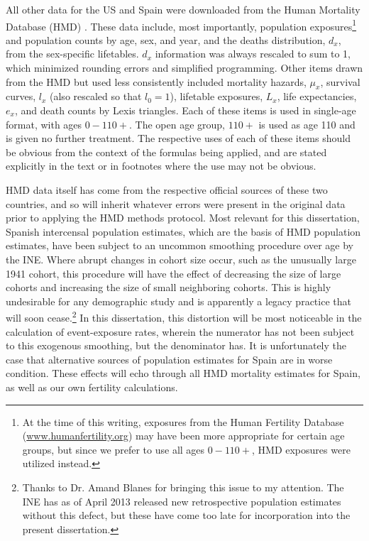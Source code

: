 All other data for the US and Spain were downloaded from the Human Mortality
Database (HMD) \citep{wilmoth2007methods}. These data include, most importantly,
population exposures\footnote{At the time of this writing, exposures from the
Human Fertility Database (\url{www.humanfertility.org}) may have been more
appropriate for certain age groups, but since we prefer to use all ages
$0-110+$, HMD exposures were utilized instead.} and population counts by age,
sex, and year, and the deaths distribution, $d_x$, from the sex-specific
lifetables. $d_x$ information was always rescaled to sum to 1, which minimized rounding errors and simplified
programming. Other items drawn from the HMD but used less consistently
included mortality hazards, $\mu_x$, survival curves, $l_x$ (also rescaled so that $l_0 = 1$), 
lifetable exposures, $L_x$,
life expectancies, $e_x$, and death counts by Lexis triangles. Each of these
items is used in single-age format, with ages $0-110+$. The open age group,
$110+$ is used as age 110 and is given no further treatment. The
respective uses of each of these items should be obvious from the context 
of the formulas being applied, and are stated explicitly in the text or in 
footnotes where the use may not be obvious.

HMD data itself has come from the respective official sources of these
two countries, and so will inherit whatever errors were present in the original
data prior to applying the HMD methods protocol. Most relevant for this
dissertation, Spanish intercensal population estimates, which are the basis of
HMD population estimates, have been subject to an uncommon smoothing
procedure over age by the INE. Where abrupt changes in cohort size occur, such
as the unusually large 1941 cohort, this procedure will have the effect of
decreasing the size of large cohorts and increasing the size of small neighboring cohorts. This is
highly undesirable for any demographic study and is apparently a legacy
practice that will soon cease.\footnote{Thanks to Dr. Amand Blanes for bringing
this issue to my attention. The INE has as of April 2013 released new
retrospective population estimates without this defect, but these have come too
late for incorporation into the present dissertation.} In this dissertation, this
distortion will be most noticeable in the calculation of event-exposure rates, 
wherein the numerator has not been subject to this exogenous smoothing, but 
the denominator has. It is unfortunately the case that alternative sources of 
population estimates for Spain are in worse condition. These effects will echo through all HMD mortality
estimates for Spain, as well as our own fertility calculations. 

